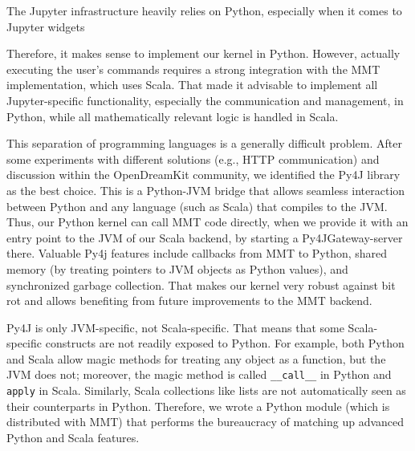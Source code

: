 The Jupyter infrastructure heavily relies on Python, especially when it comes to Jupyter widgets
%

Therefore, it makes sense to implement our kernel in Python.
However, actually executing the user's commands requires a strong integration with the MMT implementation, which uses Scala.
That made it advisable to implement all Jupyter-specific functionality, especially the communication and management, in Python, while all mathematically relevant logic is handled in Scala.

This separation of programming languages is a generally difficult problem.
After some experiments with different solutions (e.g., HTTP communication) and discussion within the OpenDreamKit community, we identified the Py4J library~\cite{Py4J} as the best choice.
This is a Python-JVM bridge that allows seamless interaction between Python and any language (such as Scala) that compiles to the JVM.
Thus, our Python kernel can call MMT code directly, when we provide it with an entry point to the JVM of our Scala backend, by starting a Py4JGateway-server there.
Valuable Py4j features include callbacks from MMT to Python, shared memory (by treating pointers to JVM objects as Python values), and synchronized garbage collection.
That makes our kernel very robust against bit rot and allows benefiting from future improvements to the MMT backend.

Py4J is only JVM-specific, not Scala-specific.
That means that some Scala-specific constructs are not readily exposed to Python.
For example, both Python and Scala allow magic methods for treating any object as a function, but the JVM does not; moreover, the magic method is called \texttt{\_\_call\_\_} in Python and \texttt{apply} in Scala.
Similarly, Scala collections like lists are not automatically seen as their counterparts in Python.
Therefore, we wrote a Python module (which is distributed with MMT) that performs the bureaucracy of matching up advanced Python and Scala features.


